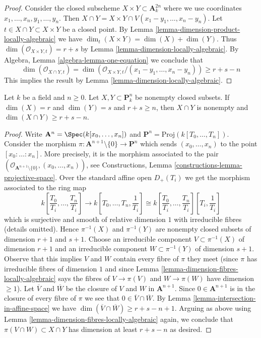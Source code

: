 \begin{proof}
Consider the closed subscheme $X \times Y \subset \mathbf{A}^{2n}_k$
where we use coordinates $x_1, \ldots, x_n, y_1, \ldots, y_n$. Then
$X \cap Y = X \times Y \cap V(x_1 - y_1, \ldots, x_n - y_n)$.
Let $t \in X \cap Y \subset X \times Y$ be a closed point.
By Lemma \ref{lemma-dimension-product-locally-algebraic}
we have $\dim_t(X \times Y) = \dim(X) + \dim(Y)$.
Thus $\dim(\mathcal{O}_{X \times Y, t}) = r + s$ by
Lemma \ref{lemma-dimension-locally-algebraic}.
By Algebra, Lemma \ref{algebra-lemma-one-equation}
we conclude that
$$
\dim(\mathcal{O}_{X \cap Y, t}) =
\dim(\mathcal{O}_{X \times Y, t}/(x_1 - y_1, \ldots, x_n - y_n)) \geq
r + s - n
$$
This implies the result by Lemma \ref{lemma-dimension-locally-algebraic}.
\end{proof}

\begin{lemma}
\label{lemma-intersection-in-projective-space}
Let $k$ be a field and $n \geq 0$. Let $X, Y \subset \mathbf{P}^n_k$
be nonempty closed subsets. If $\dim(X) = r$ and $\dim(Y) = s$ and
$r + s \geq n$, then $X \cap Y$ is nonempty and
$\dim(X \cap Y) \geq r + s - n$.
\end{lemma}

\begin{proof}
Write $\mathbf{A}^n = \Spec(k[x_0, \ldots, x_n])$ and
$\mathbf{P}^n = \text{Proj}(k[T_0, \ldots, T_n])$.
Consider the morphism
$\pi : \mathbf{A}^{n + 1} \setminus \{0\} \to \mathbf{P}^n$
which sends $(x_0, \ldots, x_n)$ to the point $[x_0 : \ldots : x_n]$.
More precisely, it is the morphism associated to the pair
$(\mathcal{O}_{\mathbf{A}^{n + 1} \setminus \{0\}}, (x_0, \ldots, x_n))$,
see Constructions, Lemma \ref{constructions-lemma-projective-space}.
Over the standard affine open $D_+(T_i)$ we get the morphism
associated to the ring map
$$
k\left[\frac{T_0}{T_i}, \ldots, \frac{T_n}{T_i}\right]
\longrightarrow
k\left[T_0, \ldots, T_n, \frac{1}{T_i}\right] \cong
k\left[\frac{T_0}{T_i}, \ldots, \frac{T_n}{T_i}\right]
\left[T_i, \frac{1}{T_i}\right]
$$
which is surjective and smooth of relative dimension $1$
with irreducible fibres (details omitted).
Hence $\pi^{-1}(X)$ and $\pi^{-1}(Y)$ are nonempty closed subsets of
dimension $r + 1$ and $s + 1$. Choose an irreducible component
$V \subset \pi^{-1}(X)$ of dimension $r + 1$ and an
irreducible component $W \subset \pi^{-1}(Y)$ of dimension $s + 1$.
Observe that this implies $V$ and $W$ contain every fibre of $\pi$
they meet (since $\pi$ has irreducible fibres of dimension $1$
and since Lemma \ref{lemma-dimension-fibres-locally-algebraic}
says the fibres of $V \to \pi(V)$ and $W \to \pi(W)$ have dimension $\geq 1$).
Let $\overline{V}$ and $\overline{W}$ be the closure of
$V$ and $W$ in $\mathbf{A}^{n + 1}$. Since $0 \in \mathbf{A}^{n + 1}$
is in the closure of every fibre of $\pi$ we see that
$0 \in \overline{V} \cap \overline{W}$. By
Lemma \ref{lemma-intersection-in-affine-space}
we have $\dim(\overline{V} \cap \overline{W}) \geq r + s - n + 1$.
Arguing as above using Lemma \ref{lemma-dimension-fibres-locally-algebraic}
again, we conclude that $\pi(V \cap W) \subset X \cap Y$
has dimension at least $r + s - n$ as desired.
\end{proof}

